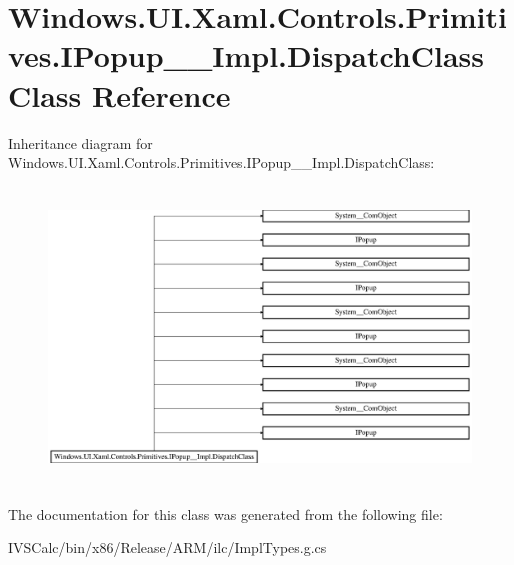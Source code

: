 \hypertarget{class_windows_1_1_u_i_1_1_xaml_1_1_controls_1_1_primitives_1_1_i_popup_____impl_1_1_dispatch_class}{}\section{Windows.\+U\+I.\+Xaml.\+Controls.\+Primitives.\+I\+Popup\+\_\+\+\_\+\+Impl.\+Dispatch\+Class Class Reference}
\label{class_windows_1_1_u_i_1_1_xaml_1_1_controls_1_1_primitives_1_1_i_popup_____impl_1_1_dispatch_class}
Inheritance diagram for Windows.\+U\+I.\+Xaml.\+Controls.\+Primitives.\+I\+Popup\+\_\+\+\_\+\+Impl.\+Dispatch\+Class\+:\begin{figure}[H]
\begin{center}
\leavevmode
\includegraphics[height=7.917737cm]{class_windows_1_1_u_i_1_1_xaml_1_1_controls_1_1_primitives_1_1_i_popup_____impl_1_1_dispatch_class}
\end{center}
\end{figure}


The documentation for this class was generated from the following file\+:\begin{DoxyCompactItemize}
\item 
I\+V\+S\+Calc/bin/x86/\+Release/\+A\+R\+M/ilc/Impl\+Types.\+g.\+cs\end{DoxyCompactItemize}
